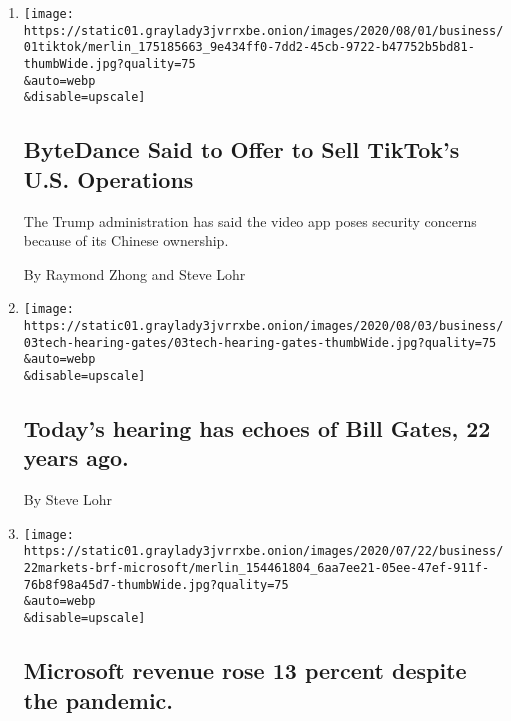 \begin{enumerate}
\def\labelenumi{\arabic{enumi}.}
\item
  \href{/2020/08/01/technology/tiktok-sale-trump-ban.html}{}

  \texttt{[image: https://static01.graylady3jvrrxbe.onion/images/2020/08/01/business/01tiktok/merlin\_175185663\_9e434ff0-7dd2-45cb-9722-b47752b5bd81-thumbWide.jpg?quality=75\\\&auto=webp\\\&disable=upscale]}

  \hypertarget{bytedance-said-to-offer-to-sell-tiktoks-us-operations}{%
  \subsection{ByteDance Said to Offer to Sell TikTok's U.S.
  Operations}\label{bytedance-said-to-offer-to-sell-tiktoks-us-operations}}

  The Trump administration has said the video app poses security
  concerns because of its Chinese ownership.

  By Raymond Zhong and Steve Lohr
\item
  \href{/live/2020/07/29/technology/tech-ceos-hearing-testimony/todays-hearing-has-echoes-of-bill-gates-22-years-ago}{}

  \texttt{[image: https://static01.graylady3jvrrxbe.onion/images/2020/08/03/business/03tech-hearing-gates/03tech-hearing-gates-thumbWide.jpg?quality=75\\\&auto=webp\\\&disable=upscale]}

  \hypertarget{todays-hearing-has-echoes-of-bill-gates-22-years-ago}{%
  \subsection{Today's hearing has echoes of Bill Gates, 22 years
  ago.}\label{todays-hearing-has-echoes-of-bill-gates-22-years-ago}}

  By Steve Lohr
\item
  \href{/live/2020/07/22/business/stock-market-today-coronavirus/microsoft-earnings}{}

  \texttt{[image: https://static01.graylady3jvrrxbe.onion/images/2020/07/22/business/22markets-brf-microsoft/merlin\_154461804\_6aa7ee21-05ee-47ef-911f-76b8f98a45d7-thumbWide.jpg?quality=75\\\&auto=webp\\\&disable=upscale]}

  \hypertarget{microsoft-revenue-rose-13-percent-despite-the-pandemic}{%
  \subsection{Microsoft revenue rose 13 percent despite the
  pandemic.}\label{microsoft-revenue-rose-13-percent-despite-the-pandemic}}


\end{enumerate}
